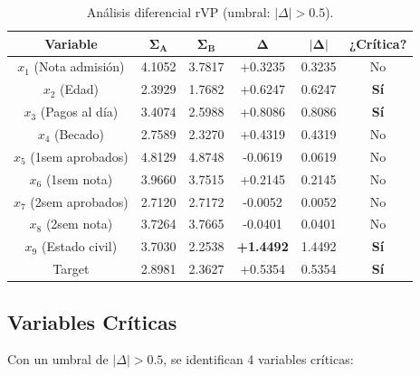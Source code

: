 \documentclass[12pt,a4paper]{article}
\begin{document}
\begin{table}[H]
    \centering
    \begin{tabular}{c|ccc|c|c}
        \toprule
        \textbf{Variable} & $\mathbf{\Sigma_A}$ & $\mathbf{\Sigma_B}$ & $\mathbf{\Delta}$ & $\mathbf{|\Delta|}$ & \textbf{¿Crítica?} \\
        \midrule
        $x_1$ (Nota admisión) & 4.1052 & 3.7817 & +0.3235 & 0.3235 & No \\
        $x_2$ (Edad) & 2.3929 & 1.7682 & +0.6247 & 0.6247 & \textbf{Sí} \\
        $x_3$ (Pagos al día) & 3.4074 & 2.5988 & +0.8086 & 0.8086 & \textbf{Sí} \\
        $x_4$ (Becado) & 2.7589 & 2.3270 & +0.4319 & 0.4319 & No \\
        $x_5$ (1sem aprobados) & 4.8129 & 4.8748 & -0.0619 & 0.0619 & No \\
        $x_6$ (1sem nota) & 3.9660 & 3.7515 & +0.2145 & 0.2145 & No \\
        $x_7$ (2sem aprobados) & 2.7120 & 2.7172 & -0.0052 & 0.0052 & No \\
        $x_8$ (2sem nota) & 3.7264 & 3.7665 & -0.0401 & 0.0401 & No \\
        \rowcolor{red!20}
        $x_9$ (Estado civil) & 3.7030 & 2.2538 & \textbf{+1.4492} & 1.4492 & \textbf{Sí} \\
        Target & 2.8981 & 2.3627 & +0.5354 & 0.5354 & \textbf{Sí} \\
        \bottomrule
    \end{tabular}
    \caption{Análisis diferencial rVP (umbral: $|\Delta| > 0.5$).}
\end{table}

\subsection{Variables Críticas}

Con un umbral de $|\Delta| > 0.5$, se identifican 4 variables críticas:
\end{document}
